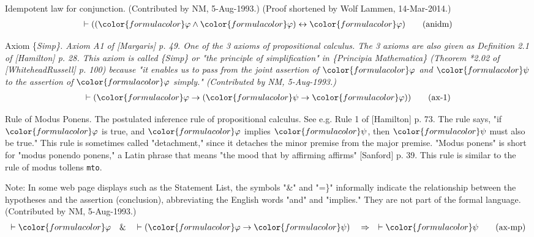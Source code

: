 \begin{lemma} Idempotent law for conjunction.  (Contributed
by NM, 5-Aug-1993.)  (Proof
     shortened by Wolf Lammen, 14-Mar-2014.)
\begin{align}
\vdash ( ( {\color{formulacolor}\varphi} \wedge {\color{formulacolor}\varphi} )
    \leftrightarrow {\color{formulacolor}\varphi} )\label{eq:anidm}\tag{anidm}
\end{align}
\end{lemma}


\begin{lemma} Axiom \{\em Simp\}.  Axiom A1 of [Margaris] p.
49.  One of the 3 axioms of
     propositional calculus.  The 3 axioms are also given as Definition 2.1 of
     [Hamilton] p. 28.  This axiom is called \{\em Simp\} or "the principle of
     simplification" in \{\em Principia Mathematica\} (Theorem *2.02 of
     [WhiteheadRussell] p. 100) because "it enables us to pass from the joint
     assertion of ${\color{formulacolor}\varphi}$ and
${\color{formulacolor}\psi}$ to the assertion of
${\color{formulacolor}\varphi}$ simply."
     (Contributed by NM, 5-Aug-1993.)
\begin{align}
\vdash ( {\color{formulacolor}\varphi} \rightarrow ( {\color{formulacolor}\psi}
    \rightarrow {\color{formulacolor}\varphi} ) )\label{eq:ax-1}\tag{ax-1}
\end{align}
\end{lemma}


\begin{lemma} Rule of Modus Ponens.  The postulated inference
rule of propositional
       calculus.  See e.g.  Rule 1 of [Hamilton] p. 73.  The rule says, "if
       ${\color{formulacolor}\varphi}$ is true, and
${\color{formulacolor}\varphi}$ implies ${\color{formulacolor}\psi}$, then
${\color{formulacolor}\psi}$ must also be
       true."  This rule is sometimes called "detachment," since it detaches
       the minor premise from the major premise.  "Modus ponens" is short for
       "modus ponendo ponens," a Latin phrase that means "the mood that by
       affirming affirms" [Sanford] p. 39.  This rule is similar to the rule
of
       modus tollens {\tt mto}.

       Note:  In some web page displays such as the Statement List, the
symbols
       "\&" and "=\}" informally indicate the relationship between the
hypotheses
       and the assertion (conclusion), abbreviating the English words "and"
and
       "implies."  They are not part of the formal language.  (Contributed by
       NM, 5-Aug-1993.)
\begin{align}
\vdash {\color{formulacolor}\varphi}\quad\&\quad \vdash (
    {\color{formulacolor}\varphi} \rightarrow {\color{formulacolor}\psi}
    )\quad\Rightarrow\quad \vdash {\color{formulacolor}\psi}\label{eq:ax-mp}\tag{ax-mp}
\end{align}
\end{lemma}


